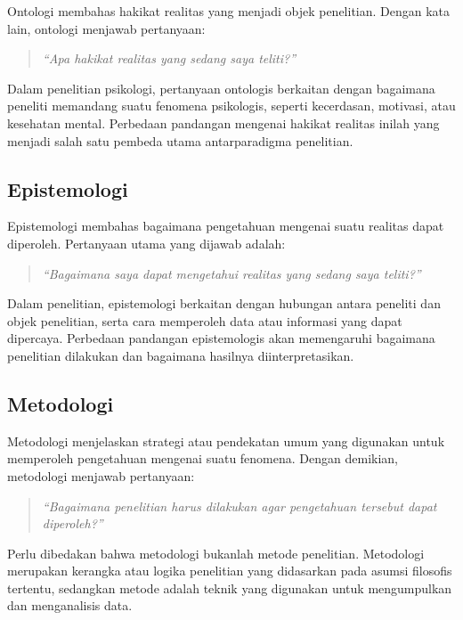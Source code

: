 \documentclass[
  indonesian,
  letterpaper,
  DIV=11,
  numbers=noendperiod]{scrreprt}
\begin{document}
Ontologi membahas hakikat realitas yang menjadi objek penelitian. Dengan
kata lain, ontologi menjawab pertanyaan:

\begin{quote}
\emph{``Apa hakikat realitas yang sedang saya teliti?''}
\end{quote}

Dalam penelitian psikologi, pertanyaan ontologis berkaitan dengan
bagaimana peneliti memandang suatu fenomena psikologis, seperti
kecerdasan, motivasi, atau kesehatan mental. Perbedaan pandangan
mengenai hakikat realitas inilah yang menjadi salah satu pembeda utama
antarparadigma penelitian.

\subsection{Epistemologi}\label{epistemologi}

Epistemologi membahas bagaimana pengetahuan mengenai suatu realitas
dapat diperoleh. Pertanyaan utama yang dijawab adalah:

\begin{quote}
\emph{``Bagaimana saya dapat mengetahui realitas yang sedang saya
teliti?''}
\end{quote}

Dalam penelitian, epistemologi berkaitan dengan hubungan antara peneliti
dan objek penelitian, serta cara memperoleh data atau informasi yang
dapat dipercaya. Perbedaan pandangan epistemologis akan memengaruhi
bagaimana penelitian dilakukan dan bagaimana hasilnya diinterpretasikan.

\subsection{Metodologi}\label{metodologi}

Metodologi menjelaskan strategi atau pendekatan umum yang digunakan
untuk memperoleh pengetahuan mengenai suatu fenomena. Dengan demikian,
metodologi menjawab pertanyaan:

\begin{quote}
\emph{``Bagaimana penelitian harus dilakukan agar pengetahuan tersebut
dapat diperoleh?''}
\end{quote}

Perlu dibedakan bahwa metodologi bukanlah metode penelitian. Metodologi
merupakan kerangka atau logika penelitian yang didasarkan pada asumsi
filosofis tertentu, sedangkan metode adalah teknik yang digunakan untuk
mengumpulkan dan menganalisis data.
\end{document}
